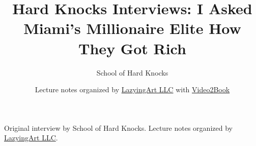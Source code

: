 \documentclass[11pt,oneside]{book}
\begin{document}
\frontmatter
\title{Hard Knocks Interviews: I Asked Miami's Millionaire Elite How They Got Rich}
\author{School of Hard Knocks}
\date{Lecture notes organized by \href{https://lazying.art}{LazyingArt LLC} with \href{https://github.com/lachlanchen/Video2Book}{Video2Book}}
\maketitle
\begin{center}
\small Original interview by School of Hard Knocks. Lecture notes organized by \href{https://lazying.art}{LazyingArt LLC}.
\end{center}
\clearpage
\mainmatter

\end{document}
